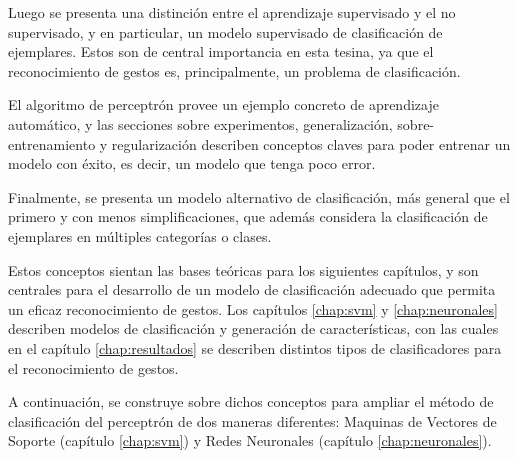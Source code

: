 Luego se presenta una distinción entre el aprendizaje supervisado y el no supervisado, y en particular, un modelo supervisado de clasificación de ejemplares. Estos son de central importancia en esta tesina, ya que el reconocimiento de gestos es, principalmente, un problema de clasificación.

El algoritmo de perceptrón provee un ejemplo concreto de aprendizaje automático, y las secciones sobre experimentos, generalización, sobre-entrenamiento y regularización describen conceptos claves para poder entrenar un modelo con éxito, es decir, un modelo que tenga poco error.

Finalmente, se presenta un modelo alternativo de clasificación, más general que el primero y con menos simplificaciones, que además considera la clasificación de ejemplares en múltiples categorías o clases.

Estos conceptos sientan las bases teóricas para los siguientes capítulos, y son centrales para el desarrollo de un modelo de clasificación adecuado que permita un eficaz reconocimiento de gestos. Los capítulos \ref{chap:svm}  y \ref{chap:neuronales} describen modelos de clasificación y generación de características, con las cuales en el capítulo \ref{chap:resultados} se describen distintos tipos de clasificadores para el reconocimiento de gestos.

A continuación, se construye sobre dichos conceptos para ampliar el método de clasificación del perceptrón de dos maneras diferentes: Maquinas de Vectores de Soporte (capítulo \ref{chap:svm}) y Redes Neuronales (capítulo \ref{chap:neuronales}).
